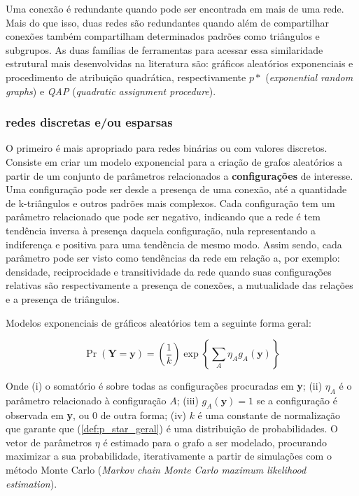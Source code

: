 \documentclass{article}
\begin{document}
Uma conexão é redundante quando pode ser encontrada em mais de uma rede. Mais do
que isso, duas redes são redundantes quando além de compartilhar conexões também
compartilham determinados padrões como triângulos e subgrupos. As duas
famílias de ferramentas para acessar essa similaridade estrutural mais
desenvolvidas na literatura são: gráficos aleatórios exponenciais e procedimento
de atribuição quadrática, respectivamente $p*$ (\textit{exponential random
graphs}) e \textit{QAP} (\textit{quadratic assignment procedure}).

\subsubsection{redes discretas e/ou esparsas}

O primeiro é mais apropriado para redes binárias ou com valores discretos.
Consiste em criar um modelo exponencial para a criação de grafos aleatórios a
partir de um conjunto de parâmetros relacionados a \textbf{configurações} de
interesse. Uma configuração pode ser desde a presença de uma conexão, até a
quantidade de k-triângulos e outros padrões mais complexos. Cada configuração
tem um parâmetro relacionado que pode ser negativo, indicando que a rede é tem
tendência inversa à presença daquela configuração, nula representando a
indiferença e positiva para uma tendência de mesmo modo. Assim sendo, cada
parâmetro pode ser visto como tendências da rede em relação a, por exemplo:
densidade, reciprocidade e transitividade da rede quando suas configurações
relativas são respectivamente a presença de conexões, a mutualidade das
relações e a presença de triângulos. 

Modelos exponenciais de gráficos aleatórios tem a seguinte forma geral:

\begin{equation}
\label{def:p_star_geral}
\Pr(\textbf{Y} = \textbf{y})
=\left(\frac{1}{k}\right)\exp\left\{\sum_A\eta_Ag_A(\textbf{y})\right\}
\end{equation}

Onde (i) o somatório é sobre todas as configurações procuradas em \textbf{y};
(ii) $\eta_A$ é o parâmetro relacionado à configuração $A$; (iii)
$g_A(\textbf{y})=1$ se a configuração é observada em \textbf{y}, ou 0 de outra
forma; (iv) $k$ é uma constante de normalização que garante que
(\ref{def:p_star_geral}) é uma distribuição de probabilidades. O vetor de
parâmetros $\eta$ é estimado para o grafo a ser modelado, procurando maximizar
a sua probabilidade, iterativamente a partir de simulações com o método Monte
Carlo (\textit{Markov chain Monte Carlo maximum likelihood estimation}).
\end{document}
